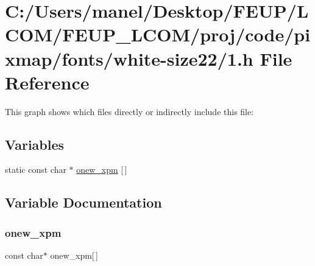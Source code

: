 \hypertarget{white-size22_21_8h}{}\section{C\+:/\+Users/manel/\+Desktop/\+F\+E\+U\+P/\+L\+C\+O\+M/\+F\+E\+U\+P\+\_\+\+L\+C\+O\+M/proj/code/pixmap/fonts/white-\/size22/1.h File Reference}
\label{white-size22_21_8h}
This graph shows which files directly or indirectly include this file\+:
\subsection*{Variables}
\begin{DoxyCompactItemize}
\item 
static const char $\ast$ \mbox{\hyperlink{white-size22_21_8h_acffd72b104beef6e4141297cadc36d46}{onew\+\_\+xpm}} \mbox{[}$\,$\mbox{]}
\end{DoxyCompactItemize}


\subsection{Variable Documentation}
\mbox{\label{white-size22_21_8h_acffd72b104beef6e4141297cadc36d46}} 
\subsubsection{\texorpdfstring{onew\_xpm}{onew\_xpm}}
{\footnotesize\ttfamily const char$\ast$ onew\+\_\+xpm\mbox{[}$\,$\mbox{]}\hspace{0.3cm}{\ttfamily [static]}}

